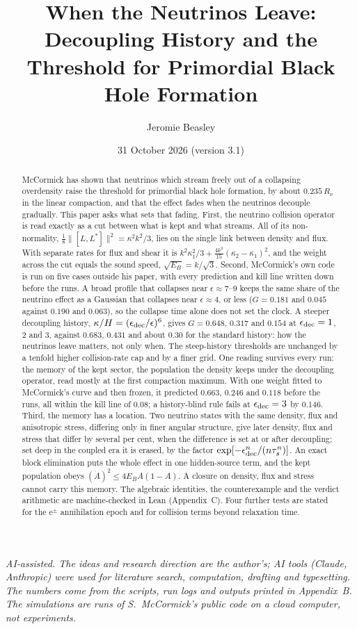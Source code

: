 \documentclass[11pt]{article}
\title{When the Neutrinos Leave:\\ Decoupling History and the Threshold for Primordial Black Hole Formation}
\author{Jeromie Beasley}
\date{31 October 2026 \quad (version 3.1)}
\begin{document}
\maketitle

\noindent\emph{AI-assisted. The ideas and research direction are the author's; AI tools (Claude, Anthropic) were used for literature search, computation, drafting and typesetting. The numbers come from the scripts, run logs and outputs printed in Appendix~B. The simulations are runs of S.~McCormick's public code on a cloud computer, not experiments.}

\begin{abstract}
McCormick has shown that neutrinos which stream freely out of a collapsing overdensity raise the threshold for primordial black hole formation, by about $0.235\,R_\nu$ in the linear compaction, and that the effect fades when the neutrinos decouple gradually. This paper asks what sets that fading. First, the neutrino collision operator is read exactly as a cut between what is kept and what streams. All of its non-normality, $\tfrac18\lVert[L,L^\ast]\rVert^2=\kappa^2k^2/3$, lies on the single link between density and flux. With separate rates for flux and shear it is $k^2\kappa_1^2/3+\tfrac{4k^2}{15}(\kappa_2-\kappa_1)^2$, and the weight across the cut equals the sound speed, $\sqrt{E_B}=k/\sqrt3$. Second, McCormick's own code is run on five cases outside his paper, with every prediction and kill line written down before the runs. A broad profile that collapses near $\epsilon\approx7$--$9$ keeps the same share of the neutrino effect as a Gaussian that collapses near $\epsilon\approx4$, or less ($G=0.181$ and $0.045$ against $0.190$ and $0.063$), so the collapse time alone does not set the clock. A steeper decoupling history, $\kappa/H=(\epsilon_{\rm dec}/\epsilon)^6$, gives $G=0.648$, $0.317$ and $0.154$ at $\epsilon_{\rm dec}=1$, $2$ and $3$, against $0.683$, $0.431$ and about $0.30$ for the standard history: how the neutrinos leave matters, not only when. The steep-history thresholds are unchanged by a tenfold higher collision-rate cap and by a finer grid. One reading survives every run: the memory of the kept sector, the population the density keeps under the decoupling operator, read mostly at the first compaction maximum. With one weight fitted to McCormick's curve and then frozen, it predicted $0.663$, $0.246$ and $0.118$ before the runs, all within the kill line of $0.08$; a history-blind rule fails at $\epsilon_{\rm dec}=3$ by $0.146$. Third, the memory has a location. Two neutrino states with the same density, flux and anisotropic stress, differing only in finer angular structure, give later density, flux and stress that differ by several per cent, when the difference is set at or after decoupling; set deep in the coupled era it is erased, by the factor $\exp[-\epsilon_{\rm dec}^n/(n\tau_s^n)]$. An exact block elimination puts the whole effect in one hidden-source term, and the kept population obeys $(\dot A)^2\le4E_BA(1-A)$. A closure on density, flux and stress cannot carry this memory. The algebraic identities, the counterexample and the verdict arithmetic are machine-checked in Lean (Appendix~C). Four further tests are stated for the e$^\pm$ annihilation epoch and for collision terms beyond relaxation time.

\end{abstract}
\end{document}
